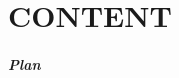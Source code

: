 \documentclass{beamer}
\begin{document}

\part{CONTENT}


\begin{frame}
  \frametitle{Plan}
  \begin{columns}
  \begin{column}{0.1 \textwidth}\end{column}
  \begin{column}{0.9 \textwidth}
  \tableofcontents[part=3,hideallsubsections]%
  \end{column}
  \end{columns}
\end{frame}


% 
% 
\end{document}
